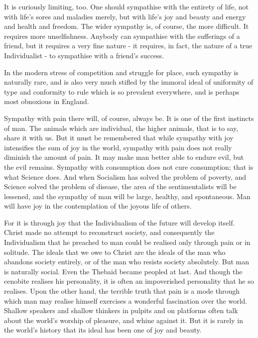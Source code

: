 It is curiously limiting, too. One should sympathise with the entirety of life, not with life’s sores and maladies merely, but with life’s joy and beauty and energy and health and freedom. The wider sympathy is, of course, the more difficult. It requires more unselfishness. Anybody can sympathise with the sufferings of a friend, but it requires a very fine nature - it requires, in fact, the nature of a true Individualist - to sympathise with a friend’s success.\par

In the modern stress of competition and struggle for place, such sympathy is naturally rare, and is also very much stifled by the immoral ideal of uniformity of type and conformity to rule which is so prevalent everywhere, and is perhaps most obnoxious in England.\par

Sympathy with pain there will, of course, always be. It is one of the first instincts of man. The animals which are individual, the higher animals, that is to say, share it with us. But it must be remembered that while sympathy with joy intensifies the sum of joy in the world, sympathy with pain does not really diminish the amount of pain. It may make man better able to endure evil, but the evil remains. Sympathy with consumption does not cure consumption; that is what Science does. And when Socialism has solved the problem of poverty, and Science solved the problem of disease, the area of the sentimentalists will be lessened, and the sympathy of man will be large, healthy, and spontaneous. Man will have joy in the contemplation of the joyous life of others.\par

For it is through joy that the Individualism of the future will develop itself. Christ made no attempt to reconstruct society, and consequently the Individualism that he preached to man could be realised only through pain or in solitude. The ideals that we owe to Christ are the ideals of the man who abandons society entirely, or of the man who resists society absolutely. But man is naturally social. Even the Thebaid became peopled at last. And though the cenobite realises his personality, it is often an impoverished personality that he so realises. Upon the other hand, the terrible truth that pain is a mode through which man may realise himself exercises a wonderful fascination over the world. Shallow speakers and shallow thinkers in pulpits and on platforms often talk about the world’s worship of pleasure, and whine against it. But it is rarely in the world’s history that its ideal has been one of joy and beauty.\par

